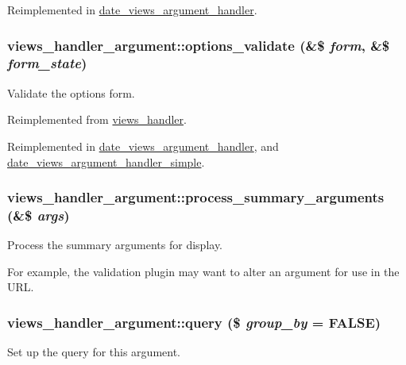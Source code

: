 Reimplemented in \hyperlink{classdate__views__argument__handler_ac9c3618a380bf3dadb6500c5e4a32cb5}{date\_\-views\_\-argument\_\-handler}.\hypertarget{classviews__handler__argument_a0d5e9e31111cfc98588f59fc9d031cc6}{
\subsubsection[{options\_\-validate}]{\setlength{\rightskip}{0pt plus 5cm}views\_\-handler\_\-argument::options\_\-validate (\&\$ {\em form}, \/  \&\$ {\em form\_\-state})}}
\label{classviews__handler__argument_a0d5e9e31111cfc98588f59fc9d031cc6}
Validate the options form. 

Reimplemented from \hyperlink{classviews__handler_a831c00b8cd3c667e25db014a3413273c}{views\_\-handler}.

Reimplemented in \hyperlink{classdate__views__argument__handler_ae970be5da3129fef9deaf4ccc2274e6c}{date\_\-views\_\-argument\_\-handler}, and \hyperlink{classdate__views__argument__handler__simple_a69e0df0155f42ffff2722fa1bc4b7f7b}{date\_\-views\_\-argument\_\-handler\_\-simple}.\hypertarget{classviews__handler__argument_a682108cbe43452b6567e3b1fd1fe897e}{
\subsubsection[{process\_\-summary\_\-arguments}]{\setlength{\rightskip}{0pt plus 5cm}views\_\-handler\_\-argument::process\_\-summary\_\-arguments (\&\$ {\em args})}}
\label{classviews__handler__argument_a682108cbe43452b6567e3b1fd1fe897e}
Process the summary arguments for display.

For example, the validation plugin may want to alter an argument for use in the URL. \hypertarget{classviews__handler__argument_af9ddabf5d386782c8ffc5785b7ae4263}{
\subsubsection[{query}]{\setlength{\rightskip}{0pt plus 5cm}views\_\-handler\_\-argument::query (\$ {\em group\_\-by} = {\ttfamily FALSE})}}
\label{classviews__handler__argument_af9ddabf5d386782c8ffc5785b7ae4263}
Set up the query for this argument.

